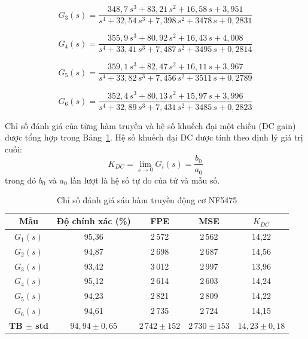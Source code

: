 \begin{equation}
    G_3(s) = \frac{348{,}7\,s^3 + 83{,}21\,s^2 + 16{,}58\,s + 3{,}951}
                  {s^4 + 32{,}54\,s^3 + 7{,}398\,s^2 + 3478\,s + 0{,}2831}
    \label{eq:tf3}
\end{equation}

\begin{equation}
    G_4(s) = \frac{355{,}9\,s^3 + 80{,}92\,s^2 + 16{,}43\,s + 4{,}008}
                  {s^4 + 33{,}41\,s^3 + 7{,}487\,s^2 + 3495\,s + 0{,}2814}
    \label{eq:tf4}
\end{equation}

\begin{equation}
    G_5(s) = \frac{359{,}1\,s^3 + 82{,}47\,s^2 + 16{,}11\,s + 3{,}967}
                  {s^4 + 33{,}82\,s^3 + 7{,}456\,s^2 + 3511\,s + 0{,}2789}
    \label{eq:tf5}
\end{equation}

\begin{equation}
    G_6(s) = \frac{352{,}4\,s^3 + 80{,}13\,s^2 + 15{,}97\,s + 3{,}996}
                  {s^4 + 32{,}89\,s^3 + 7{,}431\,s^2 + 3485\,s + 0{,}2823}
    \label{eq:tf6}
\end{equation}

Chỉ số đánh giá của từng hàm truyền và hệ số khuếch đại một chiều (DC gain)
được tổng hợp trong Bảng~\ref{tab:tf_metrics}. Hệ số khuếch đại DC được tính
theo định lý giá trị cuối:
\begin{equation}
    K_{DC} = \lim_{s \to 0} G_i(s)
           = \frac{b_0}{a_0}
    \label{eq:dc_gain}
\end{equation}
trong đó $b_0$ và $a_0$ lần lượt là hệ số tự do của tử và mẫu số.

\begin{table}[H]
    \centering
    \caption{Chỉ số đánh giá sáu hàm truyền động cơ NF5475}
    \label{tab:tf_metrics}
    \renewcommand{\arraystretch}{1.3}
    \begin{tabular}{ccccc}
        \toprule
        \textbf{Mẫu} & \textbf{Độ chính xác (\%)} & \textbf{FPE} & \textbf{MSE} & \textbf{$K_{DC}$} \\
        \midrule
        $G_1(s)$ & 95{,}36 & 2\,572 & 2\,562 & 14{,}22 \\
        $G_2(s)$ & 94{,}87 & 2\,698 & 2\,687 & 14{,}56 \\
        $G_3(s)$ & 93{,}42 & 3\,012 & 2\,997 & 13{,}96 \\
        $G_4(s)$ & 95{,}12 & 2\,614 & 2\,603 & 14{,}24 \\
        $G_5(s)$ & 94{,}23 & 2\,821 & 2\,809 & 14{,}22 \\
        $G_6(s)$ & 94{,}61 & 2\,735 & 2\,724 & 14{,}15 \\
        \midrule
        \textbf{TB $\pm$ std} & $94{,}94 \pm 0{,}65$ & $2\,742 \pm 152$ & $2\,730 \pm 153$ & $14{,}23 \pm 0{,}18$ \\
        \bottomrule
    \end{tabular}
\end{table}

